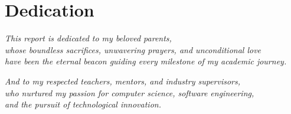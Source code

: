 \chapter*{Dedication}


\begin{center}
    \textit{This report is dedicated to my beloved parents,}\\
    \textit{whose boundless sacrifices, unwavering prayers, and unconditional love}\\
    \textit{have been the eternal beacon guiding every milestone of my academic journey.}\\
    
    \vspace{1.2cm}
    
    \textit{And to my respected teachers, mentors, and industry supervisors,}\\
    \textit{who nurtured my passion for computer science, software engineering,}\\
    \textit{and the pursuit of technological innovation.}
\end{center}

